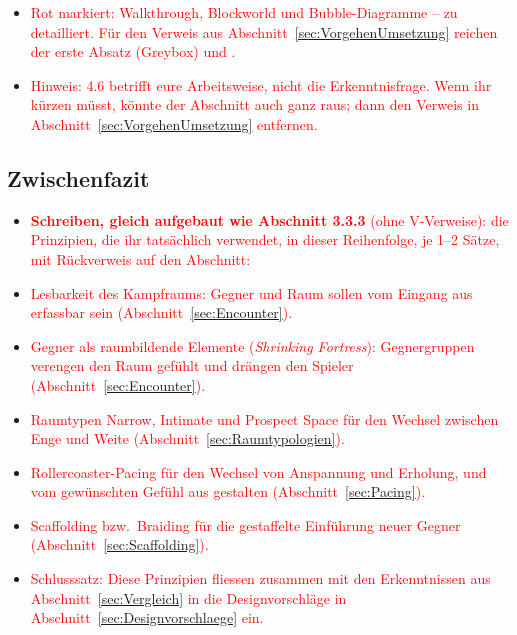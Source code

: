 \documentclass[../Main.tex]{subfiles}
\begin{document}
\begin{itemize}[leftmargin=1.5cm]
    \item \textcolor{red}{Rot markiert: Walkthrough, Blockworld und Bubble-Diagramme -- zu detailliert. Für den Verweis aus Abschnitt~\ref{sec:VorgehenUmsetzung} reichen der erste Absatz (Greybox) und .}
    \item \textcolor{red}{Hinweis: 4.6 betrifft eure Arbeitsweise, nicht die Erkenntnisfrage. Wenn ihr kürzen müsst, könnte der Abschnitt auch ganz raus; dann den Verweis in Abschnitt~\ref{sec:VorgehenUmsetzung} entfernen.}
\end{itemize}

\subsection{Zwischenfazit} \label{sec:ZwischenfazitLD}

\begin{itemize}[leftmargin=1.5cm]
    \item \textcolor{red}{\textbf{Schreiben, gleich aufgebaut wie Abschnitt 3.3.3} (ohne V-Verweise): die Prinzipien, die ihr tatsächlich verwendet, in dieser Reihenfolge, je 1--2 Sätze, mit Rückverweis auf den Abschnitt:}
    \item \textcolor{red}{Lesbarkeit des Kampfraums: Gegner und Raum sollen vom Eingang aus erfassbar sein (Abschnitt~\ref{sec:Encounter}).}
    \item \textcolor{red}{Gegner als raumbildende Elemente (\textit{Shrinking Fortress}): Gegnergruppen verengen den Raum gefühlt und drängen den Spieler (Abschnitt~\ref{sec:Encounter}).}
    \item \textcolor{red}{Raumtypen Narrow, Intimate und Prospect Space für den Wechsel zwischen Enge und Weite (Abschnitt~\ref{sec:Raumtypologien}).}
    \item \textcolor{red}{Rollercoaster-Pacing für den Wechsel von Anspannung und Erholung, und vom gewünschten Gefühl aus gestalten (Abschnitt~\ref{sec:Pacing}).}
    \item \textcolor{red}{Scaffolding bzw.\ Braiding für die gestaffelte Einführung neuer Gegner (Abschnitt~\ref{sec:Scaffolding}).}
    \item \textcolor{red}{Schlusssatz: Diese Prinzipien fliessen zusammen mit den Erkenntnissen aus Abschnitt~\ref{sec:Vergleich} in die Designvorschläge in Abschnitt~\ref{sec:Designvorschlaege} ein.}
\end{itemize}
\end{document}

